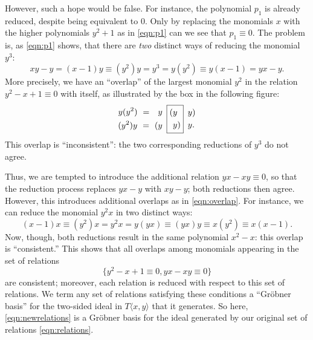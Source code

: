 However, such a hope would be false. For instance, the polynomial $p_1$ is already reduced, despite being equivalent to 0. Only by replacing the monomials $x$ with the higher polynomials $y^2+1$ as in \eqref{eqn:p1} can we see that $p_1\equiv 0$. The problem is, as \eqref{eqn:p1} shows, that there are \emph{two} distinct ways of reducing the monomial $y^3$:
\begin{equation*}
xy-y=(x-1)y\equiv (y^2)y=y^3=y(y^2)\equiv y(x-1)=yx-y.
\end{equation*}
More precisely, we have an ``overlap'' of the largest monomial $y^2$ in the relation $y^2-x+1\equiv 0$ with itself, as illustrated by the box in the following figure:
\begin{equation}
\label{eqn:overlap}
\begin{aligned}
y(y^2)\hspace{.35em}=\quad&y\\
(y^2)y\hspace{.35em}=\hspace{.35em}(&y
\end{aligned}
\hspace{.5em}
\boxed{\begin{aligned}
(&y\\
&y)
\end{aligned}}
\hspace{.5em}
\begin{aligned}
&y)\\
&y.
\end{aligned}
\end{equation}
This overlap is ``inconsistent'': the two corresponding reductions of $y^3$ do not agree.

Thus, we are tempted to introduce the additional relation $yx-xy\equiv 0$, so that the reduction process replaces $yx-y$ with $xy-y$; both reductions then agree. However, this introduces additional overlaps as in \eqref{eqn:overlap}. For instance, we can reduce the monomial $y^2x$ in two distinct ways:
\begin{equation*}
(x-1)x\equiv(y^2)x=y^2x=y(yx)\equiv(yx)y\equiv x(y^2)\equiv x(x-1).
\end{equation*}
Now, though, both reductions result in the same polynomial $x^2-x$: this overlap is ``consistent.'' This shows that all overlaps among monomials appearing in the set of relations
\begin{equation}
\label{eqn:newrelations}
\{y^2-x+1\equiv 0, yx-xy\equiv 0\}
\end{equation}
are consistent; moreover, each relation is reduced with respect to this set of relations. We term any set of relations satisfying these conditions a ``Gr\"obner basis'' for the two-sided ideal in $T\langle x,y\rangle$ that it generates. So here, \eqref{eqn:newrelations} is a Gr\"obner basis for the ideal generated by our original set of relations \eqref{eqn:relations}.

